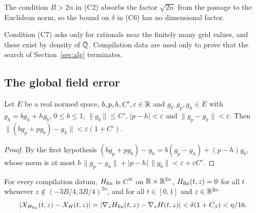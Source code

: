 The condition $B>2n$ in (C2) absorbs the factor $\sqrt{2n}$ from the passage to the Euclidean norm, so the bound
on $\delta$ in (C6) has no dimensional factor.

\begin{remark}\label{rem:cpl-values}
Condition (C7) asks only for rationals near the finitely many grid values, and these exist by density of $\mathbb{Q}$.
Compilation data are used only to prove that the search of Section~\ref{sec:alg} terminates.
\end{remark}

\subsection{The global field error}\label{sec:cpl-cutoff}

\begin{lemma}\label{lem:cpl-product}
Let $E$ be a real normed space, $b,p,h,C',\varepsilon\in\mathbb{R}$ and $g_b,g_p,g_h\in E$ with $g_h=bg_h+hg_b$,
$0\le b\le1$, $\|g_b\|\le C'$, $|p-h|<\varepsilon$ and $\|g_p-g_h\|<\varepsilon$. Then
$\|(bg_p+pg_b)-g_h\|<\varepsilon(1+C')$.
\end{lemma}

\begin{proof}
By the first hypothesis $(bg_p+pg_b)-g_h=b(g_p-g_h)+(p-h)g_b$, whose norm is at most
$b\,\|g_p-g_h\|+|p-h|\,\|g_b\|<\varepsilon+\varepsilon C'$.
\end{proof}

\begin{lemma}\label{lem:cpl-cutoff}
For every compilation datum, $H_{\mathrm{fin}}$ is $C^\infty$ on $\mathbb{R}\times\mathbb{R}^{2n}$, $H_{\mathrm{fin}}(t,z)=0$ for all $t$ whenever
$z\notin(-3B/4,3B/4)^{2n}$, and for all $t\in[0,1]$ and $z\in\mathbb{R}^{2n}$
\[
 |X_{H_{\mathrm{fin}}}(t,z)-X_H(t,z)|=|\nabla_zH_{\mathrm{fin}}(t,z)-\nabla_zH(t,z)|<\delta(1+C_\beta)<\eta/16 .
\]
\end{lemma}

